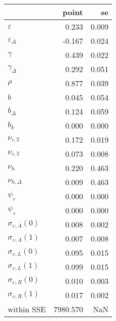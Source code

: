 \begin{tabular}{lrr}
\toprule
{} &     point &     se \\
\midrule
$\varepsilon$            &     0.233 &  0.009 \\
$\varepsilon_{\Delta}$   &    -0.167 &  0.024 \\
$\gamma$                 &     0.439 &  0.022 \\
$\gamma_{\Delta}$        &     0.292 &  0.051 \\
$\rho$                   &     0.877 &  0.039 \\
$b$                      &     0.045 &  0.054 \\
$b_{\Delta}$             &     0.124 &  0.059 \\
$b_k$                    &     0.000 &  0.000 \\
$\nu_{c,2}$              &     0.172 &  0.019 \\
$\nu_{c,3}$              &     0.073 &  0.008 \\
$\nu_{h}$                &     0.220 &  0.463 \\
$\nu_{h,\Delta}$         &     0.009 &  0.463 \\
$\psi_{r}$               &     0.000 &  0.000 \\
$\psi_{s}$               &     0.000 &  0.000 \\
$\sigma_{\upsilon,A}(0)$ &     0.008 &  0.002 \\
$\sigma_{\upsilon,A}(1)$ &     0.007 &  0.008 \\
$\sigma_{\upsilon,L}(0)$ &     0.095 &  0.015 \\
$\sigma_{\upsilon,L}(1)$ &     0.099 &  0.015 \\
$\sigma_{\upsilon,R}(0)$ &     0.010 &  0.003 \\
$\sigma_{\upsilon,R}(1)$ &     0.017 &  0.002 \\
within SSE               &  7980.570 &    NaN \\
\bottomrule
\end{tabular}

